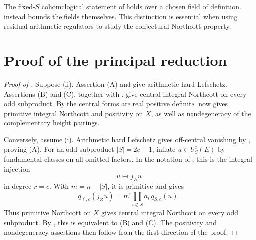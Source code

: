 \documentclass[11pt,a4paper]{article}
\theoremstyle{definition}
\newtheorem{example}[theorem]{Example}
\DeclareRobustCommand{\MathSecref}[1]{\begingroup\hypersetup{linkcolor=MathSectionLink}\Cref{#1}\endgroup}
\newcommand{\Q}{\mathbb Q}\newcommand{\R}{\mathbb R}\newcommand{\C}{\mathbb C}
\newcommand{\Z}{\mathbb Z}\newcommand{\A}{\mathbb A}\newcommand{\Fbar}{\overline F}
\numberwithin{equation}{section}
\begin{document}

The fixed-\(S\) cohomological statement of
 holds over a chosen field of definition.
 instead bounds the fields themselves.
This distinction is essential when using residual arithmetic
regulators to study the conjectural Northcott property.




\section{Proof of the principal reduction}\label{sec:proof-main}

\begin{proof}[Proof of ]
Suppose (ii). Assertion (A) and 
give arithmetic hard Lefschetz. Assertions (B) and (C), together
with , give central integral
Northcott on every odd subproduct. By 
the central forms are real positive definite.
 now gives primitive integral
Northcott and positivity on \(X\), as well as nondegeneracy
of the complementary height pairings.

Conversely, assume (i). Arithmetic hard Lefschetz gives
off-central vanishing by , proving (A).
For an odd subproduct \(|S|=2c-1\), inflate
\(u\in U_S^c(E)\) by fundamental classes on all omitted factors.
In the notation of \MathSecref{sec:chow-blocks}, this is the
integral injection
\[
 u\longmapsto j_\varnothing u
\]
in degree \(r=c\). With \(m=n-|S|\), it is primitive and
 gives
\[
 q_{\ell,c}(j_\varnothing u)
       =m!\prod_{i\notin S}a_i\,q_{S,c}(u).
\]
Thus primitive Northcott on \(X\) gives central integral
Northcott on every odd subproduct. By
, this is equivalent to (B) and (C).
The positivity and nondegeneracy assertions then follow from
the first direction of the proof.
\end{proof}
\end{document}

